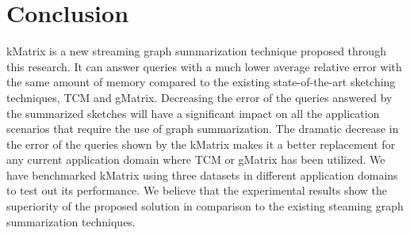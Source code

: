 \section{Conclusion}

kMatrix is a new streaming graph summarization technique proposed through this research. It can answer queries with a much lower average relative error with the same amount of memory compared to the existing state-of-the-art sketching techniques, TCM and gMatrix. Decreasing the error of the queries answered by the summarized sketches will have a significant impact on all the application scenarios that require the use of graph summarization. The dramatic decrease in the error of the queries shown by the kMatrix makes it a better replacement for any current application domain where TCM or gMatrix has been utilized. We have benchmarked kMatrix using three datasets in different application domains to test out its performance.  We believe that the experimental results show the superiority of the proposed solution in comparison to the existing steaming graph summarization techniques.